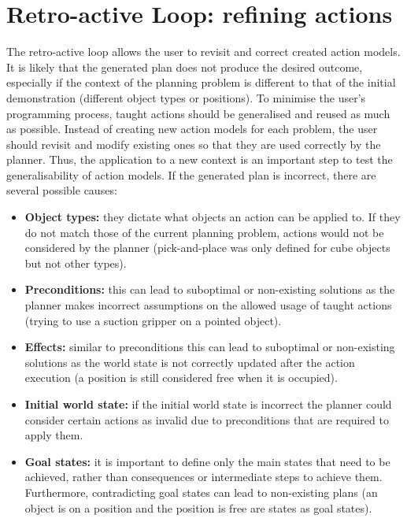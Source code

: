 \section{Retro-active Loop: refining actions}
The retro-active loop allows the user to revisit and correct created action models.
It is likely that the generated plan does not produce the desired outcome, especially if the context of the planning problem is different to that of the initial demonstration (\eg different object types or positions).
To minimise the user's programming process, taught actions should be generalised and reused as much as possible.
Instead of creating new action models for each problem, the user should revisit and modify existing ones so that they are used correctly by the planner.
Thus, the application to a new context is an important step to test the generalisability of action models.
If the generated plan is incorrect, there are several possible causes:
\begin{itemize}
	\item \textbf{Object types:} they dictate what objects an action can be applied to. If they do not match those of the current planning problem, actions would not be considered by the planner (\eg pick-and-place was only defined for cube objects but not other types).
	\item \textbf{Preconditions:} this can lead to suboptimal or non-existing solutions as the planner makes incorrect assumptions on the allowed usage of taught actions (\eg trying to use a suction gripper on a pointed object).
	\item \textbf{Effects:} similar to preconditions this can lead to suboptimal or non-existing solutions as the world state is not correctly updated after the action execution (\eg a position is still considered free when it is occupied).
	\item \textbf{Initial world state:} if the initial world state is incorrect the planner could consider certain actions as invalid due to preconditions that are required to apply them.
	\item \textbf{Goal states:} it is important to define only the main states that need to be achieved, rather than consequences or intermediate steps to achieve them. Furthermore, contradicting goal states can lead to non-existing plans (\eg an object is on a position and the position is free are states as goal states).
\end{itemize}

